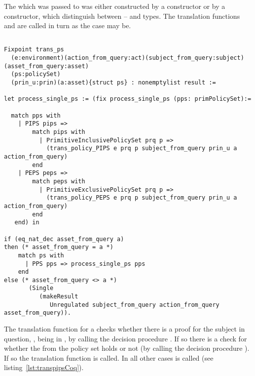 The  which was passed to  was either constructed by a  constructor or by a  constructor, which distinguish between -- and  types. The translation functions  and  are called in turn as the case may be.


\begin{minipage}[c]{0.95\textwidth}
\begin{lstlisting}

Fixpoint trans_ps
  (e:environment)(action_from_query:act)(subject_from_query:subject)(asset_from_query:asset)
  (ps:policySet)
  (prin_u:prin)(a:asset){struct ps} : nonemptylist result :=

let process_single_ps := (fix process_single_ps (pps: primPolicySet):=
  
  match pps with 
    | PIPS pips => 
        match pips with 
          | PrimitiveInclusivePolicySet prq p => 
            (trans_policy_PIPS e prq p subject_from_query prin_u a action_from_query)                
        end
    | PEPS peps => 
        match peps with 
          | PrimitiveExclusivePolicySet prq p => 
            (trans_policy_PEPS e prq p subject_from_query prin_u a action_from_query)
        end  
   end) in

if (eq_nat_dec asset_from_query a)
then (* asset_from_query = a *)  
    match ps with
      | PPS pps => process_single_ps pps
    end
else (* asset_from_query <> a *)
       (Single 
          (makeResult 
             Unregulated subject_from_query action_from_query asset_from_query)).
\end{lstlisting}
\end{minipage}




The  translation function for a  checks whether there is a proof for the subject in question, , being in , by calling the decision procedure . If so there is a check for whether the  from the policy set holds or not (by calling the decision procedure ). If so the translation function  is called. In all other cases  is called (see listing~\ref{lst:transpipsCoq}).

